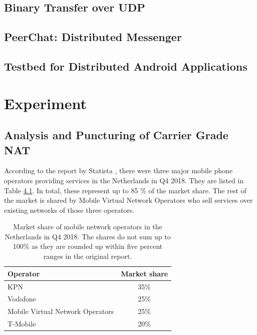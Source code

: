 \section{Binary Transfer over UDP}

\section{PeerChat: Distributed Messenger}

\section{Testbed for Distributed Android Applications}


\chapter{Experiment}

\section{Analysis and Puncturing of Carrier Grade NAT}

According to the report by Statista \cite{statista:marketshare}, there were three major mobile phone operators providing services in the Netherlands in Q4 2018. They are listed in Table \ref{table_marketshare}. In total, these represent up to 85 \% of the market share. The rest of the market is shared by Mobile Virtual Network Operators who sell services over existing networks of those three operators.

\begin{table}[h!]
    \centering
    \begin{tabular}{ | l | c | }
        \hline
        \textbf{Operator} & \textbf{Market share} \\
        \hline
        KPN & 35\% \\
        Vodafone & 25\% \\
        Mobile Virtual Network Operators & 25\% \\
        T-Mobile & 20\% \\
        \hline
    \end{tabular}
    \caption{Market share of mobile network operators in the Netherlands in Q4 2018. The shares do not sum up to 100\% as they are rounded up within five percent ranges in the original report. \cite{statista:marketshare}}
    \label{table_marketshare}
\end{table}

